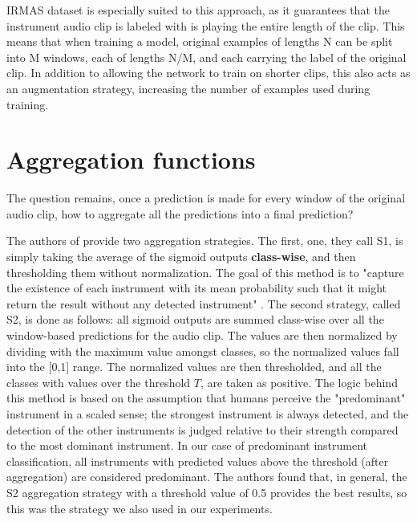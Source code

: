 IRMAS dataset is especially suited to this approach, as it guarantees that the instrument audio clip is labeled with is playing the entire length of the clip. This means that when training a model, original examples of lengths N can be split into M windows, each of lengths N/M, and each carrying the label of the original clip. In addition to allowing the network to train on shorter clips, this also acts as an augmentation strategy, increasing the number of examples used during training.

\section{Aggregation functions}
\label{sec:aggregation-functions}

The question remains, once a prediction is made for every window of the original audio clip, how to aggregate all the predictions into a final prediction?

The authors of \cite{hanetal_2016} provide two aggregation strategies. The first, one, they call S1, is simply taking the average of the sigmoid outputs \textbf{class-wise}, and then thresholding them without normalization. The goal of this method is to "capture the existence of each instrument with its mean probability such that it might return the result without any detected instrument" \cite{hanetal_2016}. The second strategy, called S2, is done as follows: all sigmoid outputs are summed class-wise over all the window-based predictions for the audio clip. The values are then normalized by dividing with the maximum value amongst classes, so the normalized values fall into the [0,1] range. The normalized values are then thresholded, and all the classes with values over the threshold $T$, are taken as positive. The logic behind this method is based on the assumption that humans perceive the "predominant" instrument in a scaled sense; the strongest instrument is always detected, and the detection of the other instruments is judged relative to their strength compared to the most dominant instrument. In our case of predominant instrument classification, all instruments with predicted values above the threshold (after aggregation) are considered predominant. The authors found that, in general, the S2 aggregation strategy with a threshold value of 0.5 provides the best results, so this was the strategy we also used in our experiments. 

